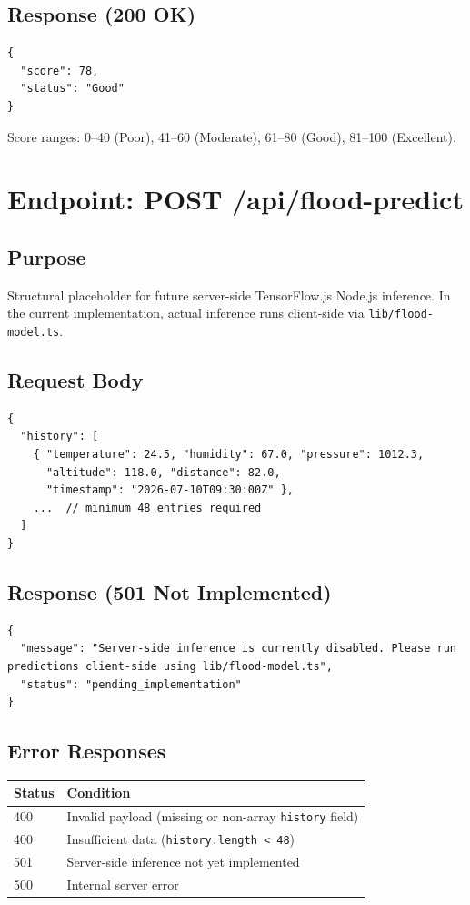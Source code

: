 \subsection{Response (200 OK)}
\begin{lstlisting}[language={},caption={GET /api/environment-score response}]
{
  "score": 78,
  "status": "Good"
}
\end{lstlisting}

Score ranges: 0--40 (Poor), 41--60 (Moderate), 61--80 (Good), 81--100 (Excellent).

\section{Endpoint: POST /api/flood-predict}

\subsection{Purpose}
Structural placeholder for future server-side TensorFlow.js Node.js inference. In the current implementation, actual inference runs client-side via \texttt{lib/\allowbreak{}flood-model.\allowbreak{}ts}.

\subsection{Request Body}
\begin{lstlisting}[language={},caption={POST /api/flood-predict request body}]
{
  "history": [
    { "temperature": 24.5, "humidity": 67.0, "pressure": 1012.3,
      "altitude": 118.0, "distance": 82.0,
      "timestamp": "2026-07-10T09:30:00Z" },
    ...  // minimum 48 entries required
  ]
}
\end{lstlisting}

\subsection{Response (501 Not Implemented)}
\begin{lstlisting}[language={},caption={POST /api/flood-predict current response}]
{
  "message": "Server-side inference is currently disabled. Please run predictions client-side using lib/flood-model.ts",
  "status": "pending_implementation"
}
\end{lstlisting}

\subsection{Error Responses}
\begin{tabular}{|l|l|}
\hline
\rowcolor{FloodLight}
\textbf{Status} & \textbf{Condition} \\
\hline
400 & Invalid payload (missing or non-array \texttt{history} field) \\
400 & Insufficient data (\texttt{history.\allowbreak{}length < 48}) \\
501 & Server-side inference not yet implemented \\
500 & Internal server error \\
\hline
\end{tabular}


